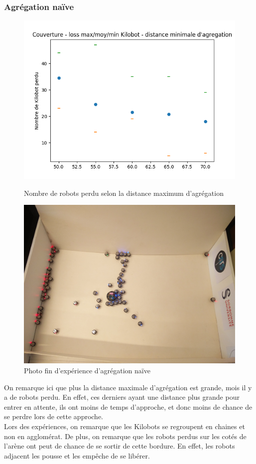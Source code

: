 \documentclass[a4paper]{article}
\begin{document}
\subsubsection{Agrégation naïve}
\begin{figure}[h]
	\begin{minipage}[c]{.46\linewidth}
		\centering
		\includegraphics[width=1.1\linewidth]{../../script_results/Agregation_naive_loss}
		\caption{Nombre de robots perdu selon la distance maximum d'agrégation}
	\end{minipage}
	\hfill%
	\begin{minipage}[c]{.46\linewidth}
		\centering
		\includegraphics[width=1.1\linewidth]{../../script_results/Resultats_aggreg_naive.jpg}
		\caption{Photo fin d'expérience d'agrégation naïve}
	\end{minipage}
\end{figure}
On remarque ici que plus la distance maximale d'agrégation est grande, mois il y a de robots perdu. En effet, ces derniers ayant une distance plus grande pour entrer en attente, ils ont moins de temps d'approche, et donc moins de chance de se perdre lors de cette approche.\\
Lors des expériences, on remarque que les Kilobots se regroupent en chaines et non en agglomérat. De plus, on remarque que les robots perdus sur les cotés de l'arène ont peut de chance de se sortir de cette bordure. En effet, les robots adjacent les pousse et les empêche de se libérer.
\newpage
\end{document}

